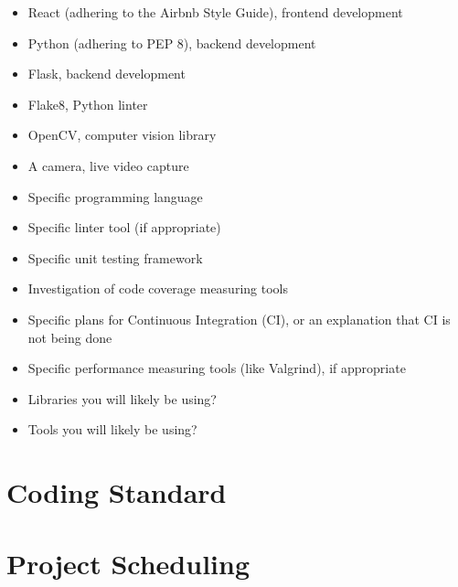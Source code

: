 \documentclass{article}
\begin{document}
\begin{itemize}
\item React (adhering to the Airbnb Style Guide), frontend development
\item Python (adhering to PEP 8), backend development
\item Flask, backend development
\item Flake8, Python linter
\item OpenCV, computer vision library
\item A camera, live video capture

\item Specific programming language
\item Specific linter tool (if appropriate)
\item Specific unit testing framework
\item Investigation of code coverage measuring tools
\item Specific plans for Continuous Integration (CI), or an explanation that CI
  is not being done
\item Specific performance measuring tools (like Valgrind), if
  appropriate
\item Libraries you will likely be using?
\item Tools you will likely be using?
\end{itemize}

\section{Coding Standard}

\section{Project Scheduling}

\end{document}
